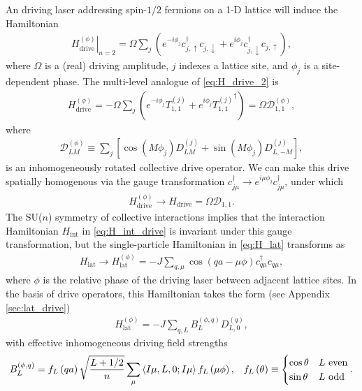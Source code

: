 \documentclass[nofootinbib,notitlepage,11pt]{revtex4-2}
\renewcommand{\t}{\text} %
\newcommand{\f}[2]{\dfrac{#1}{#2}} %
\newcommand{\p}[1]{\left(#1\right)} %
\renewcommand{\sp}[1]{\left[#1\right]} %
\newcommand{\bk}{\Braket} %
\newcommand{\1}{\mathds{1}}
\newcommand{\up}{\uparrow}
\newcommand{\dn}{\downarrow}
\newcommand{\D}{\mathcal{D}}
\begin{document}
An driving laser addressing spin-$1/2$ fermions on a 1-D lattice will
induce the Hamiltonian
\begin{align}
  \left. H_{\t{drive}}^{(\phi)} \right|_{n=2}
  = \Omega \sum_j
  \p{e^{-i\phi_j} c_{j,\up}^\dag c_{j,\dn}
    + e^{i\phi_j} c_{j,\dn}^\dag c_{j,\up}},
  \label{eq:H_drive_2}
\end{align}
where $\Omega$ is a (real) driving amplitude, $j$ indexes a lattice
site, and $\phi_j$ is a site-dependent phase.  The multi-level
analogue of \eqref{eq:H_drive_2} is
\begin{align}
  H_{\t{drive}}^{(\phi)}
  = -\Omega \sum_j \p{e^{-i\phi_j} T_{1,1}^{(j)}
    + e^{i\phi_j} {T_{1,1}^{(j)}}^\dag}
  = \Omega \D_{1,1}^{(\phi)},
  \label{eq:H_drive}
\end{align}
where
\begin{align}
  \D_{LM}^{(\phi)}
  \equiv \sum_j \sp{\cos\p{M\phi_j} D_{LM}^{(j)}
    + \sin\p{M\phi_j} D_{L,-M}^{(j)}},
  \label{eq:drive_rot}
\end{align}
is an inhomogeneously rotated collective drive operator.  We can make
this drive spatially homogenous via the gauge transformation
$c_{j\mu}^\dag \to e^{i\mu\phi_j} c_{j\mu}^\dag$, under which
\begin{align}
  H_{\t{drive}}^{(\phi)} \to H_{\t{drive}} = \Omega \D_{1,1}.
\end{align}
The SU($n$) symmetry of collective interactions implies that the
interaction Hamiltonian $H_{\t{int}}$ in \eqref{eq:H_int_drive} is
invariant under this gauge transformation, but the single-particle
Hamiltonian in \eqref{eq:H_lat} transforms as
\begin{align}
  H_{\t{lat}}
  \to H_{\t{lat}}^{(\phi)}
  = -J \sum_{q,\mu} \cos\p{qa-\mu\phi} c_{q\mu}^\dag c_{q\mu},
  \label{eq:H_lat_SOC}
\end{align}
where $\phi$ is the relative phase of the driving laser between
adjacent lattice sites.  In the basis of drive operators, this
Hamiltonian takes the form (see Appendix \ref{sec:lat_drive})
\begin{align}
  H_{\t{lat}}^{(\phi)} = -J \sum_{q,L} B_L^{(\phi,q)} D_{L,0}^{(q)},
  \label{eq:H_lat_drive}
\end{align}
with effective inhomogeneous driving field strengths
\begin{align}
  B_L^{(\phi,q)} = f_L\p{qa} \sqrt{\f{L+1/2}{n}}
  \sum_\mu \bk{I\mu,L,0;I\mu} f_L\p{\mu\phi},
  &&
  f_L\p{\theta} \equiv
  \begin{cases}
    \cos\theta & L~\t{even} \\
    \sin\theta & L~\t{odd}
  \end{cases}.
\end{align}
\end{document}
